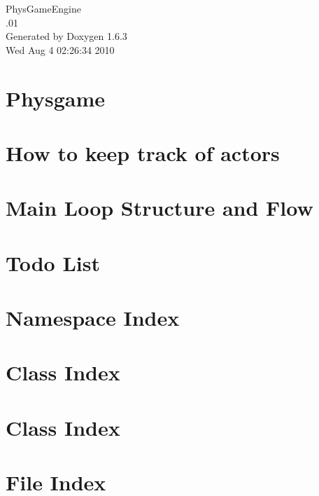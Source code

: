 \documentclass[a4paper]{book}
\begin{document}
\hypersetup{pageanchor=false}
\begin{titlepage}
\vspace*{7cm}
\begin{center}
{\Large PhysGameEngine \\[1ex]\large .01 }\\
\vspace*{1cm}
{\large Generated by Doxygen 1.6.3}\\
\vspace*{0.5cm}
{\small Wed Aug 4 02:26:34 2010}\\
\end{center}
\end{titlepage}
\clearemptydoublepage
{}
\tableofcontents
\clearemptydoublepage
{}
\hypersetup{pageanchor=true}
\chapter{Physgame}
\label{index}\hypertarget{index}{}
\chapter{How to keep track of actors}
\label{actorcontainer1}
\hypertarget{actorcontainer1}{}

\chapter{Main Loop Structure and Flow}
\label{mainloop1}
\hypertarget{mainloop1}{}

\chapter{Todo List}
\label{todo}
\hypertarget{todo}{}

\chapter{Namespace Index}

\chapter{Class Index}

\chapter{Class Index}

\chapter{File Index}

\end{document}
